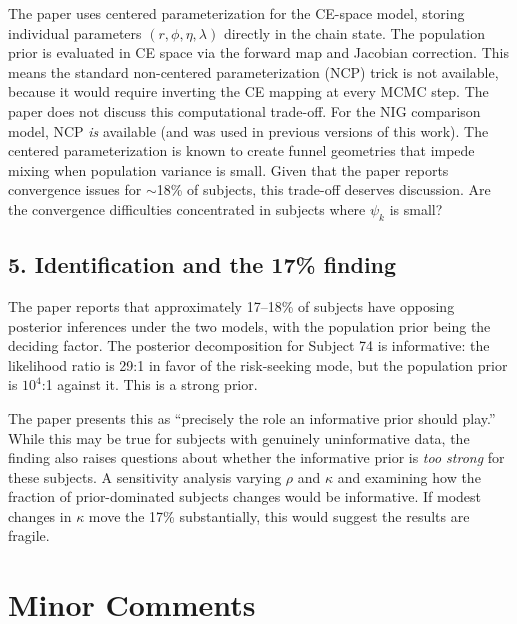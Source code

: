 \documentclass[12pt]{article}
\begin{document}
The paper uses centered parameterization for the CE-space model, storing
individual parameters $(r, \phi, \eta, \lambda)$ directly in the chain state.
The population prior is evaluated in CE space via the forward map and Jacobian
correction. This means the standard non-centered parameterization (NCP) trick
is not available, because it would require inverting the CE mapping at every
MCMC step. The paper does not discuss this computational trade-off. For the NIG
comparison model, NCP \textit{is} available (and was used in previous versions
of this work). The centered parameterization is known to create funnel
geometries that impede mixing when population variance is small. Given that the
paper reports convergence issues for $\sim$18\% of subjects, this trade-off
deserves discussion. Are the convergence difficulties concentrated in subjects
where $\psi_k$ is small?

\subsection*{5. Identification and the 17\% finding}

The paper reports that approximately 17--18\% of subjects have opposing
posterior inferences under the two models, with the population prior being the
deciding factor. The posterior decomposition for Subject 74 is informative:
the likelihood ratio is 29:1 in favor of the risk-seeking mode, but the
population prior is $10^4$:1 against it. This is a strong prior.

The paper presents this as ``precisely the role an informative prior should
play.'' While this may be true for subjects with genuinely uninformative data,
the finding also raises questions about whether the informative prior is
\textit{too strong} for these subjects. A sensitivity analysis varying $\rho$
and $\kappa$ and examining how the fraction of prior-dominated subjects changes
would be informative. If modest changes in $\kappa$ move the 17\% substantially,
this would suggest the results are fragile.

\section*{Minor Comments}
\end{document}
